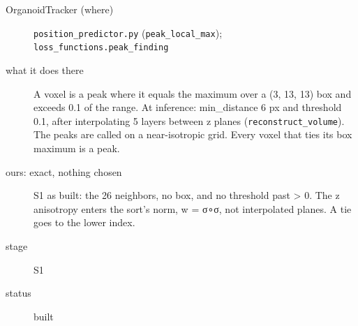 \begin{description}
\item[{OrganoidTracker (where)}] \texttt{position\_\allowbreak{}predictor.\allowbreak{}py} (\texttt{peak\_\allowbreak{}local\_\allowbreak{}max}); \texttt{loss\_\allowbreak{}functions.\allowbreak{}peak\_\allowbreak{}finding}
\item[{what it does there}] A voxel is a peak where it equals the maximum over a (3, 13, 13) box and exceeds 0.1 of the range. At inference: min\_\allowbreak{}distance 6 px and threshold 0.1, after interpolating 5 layers between z planes (\texttt{reconstruct\_\allowbreak{}volume}). The peaks are called on a near-isotropic grid. Every voxel that ties its box maximum is a peak.
\item[{ours: exact, nothing chosen}] S1 as built: the 26 neighbors, no box, and no threshold past > 0. The z anisotropy enters the sort's norm, w = σ∘σ, not interpolated planes. A tie goes to the lower index.
\item[{stage}] S1
\item[{status}] built
\end{description}

